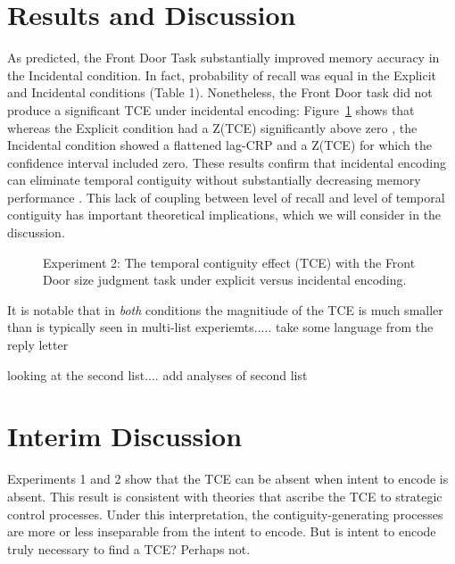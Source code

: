 \documentclass[man,natbib,floatsintext]{apa6} %
\begin{document}
\section{Results and Discussion}
As predicted, the Front Door Task substantially improved memory accuracy in the Incidental condition. In fact, probability of recall was equal in the Explicit and Incidental conditions (Table 1). Nonetheless, the Front Door task did not produce a significant TCE under incidental encoding: Figure~\ref{door} shows that whereas the Explicit condition \color{red} had a \label{done-11} Z(TCE) significantly above zero \color{black}, the Incidental condition showed a flattened lag-CRP and a Z(TCE) for which the confidence interval included zero. These results confirm that incidental encoding can eliminate temporal contiguity without substantially decreasing memory performance \citep{NairEtal17}. This lack of coupling between level of recall and level of temporal contiguity has important theoretical implications, which we will consider in the discussion.


\begin{figure}%
\caption{Experiment 2: The temporal contiguity effect (TCE) with the Front Door size judgment task under explicit versus incidental encoding. \paneltext}
\label{door}
\end{figure}


\label{TODO-5} It is notable that in \emph{both} conditions the magnitiude of the TCE is much smaller than is typically seen in multi-list experiemts..... take some language from the reply letter

\label{TODO-6} looking at the second list.... add analyses of second list







\section{Interim Discussion}
Experiments 1 and 2 show that the TCE can be absent when intent to encode is absent. This result is consistent with theories that ascribe the TCE to strategic control processes. Under this interpretation, the contiguity-generating processes are more or less inseparable from the intent to encode. But is intent to encode truly necessary to find a TCE? Perhaps not.
\end{document}
